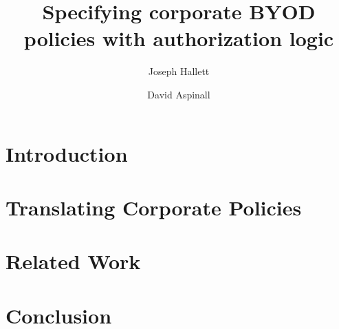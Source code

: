 \documentclass{easychair}
\title{Specifying corporate BYOD policies with authorization logic}
\author{
  Joseph Hallett\inst{1}
  \and
  David Aspinall\inst{1}
}
\institute{
  University of Edinburgh
}
\begin{document}
\maketitle

\begin{abstract}
\end{abstract}

\section{Introduction}


\section{Translating Corporate Policies}

\section{Related Work}

\section{Conclusion}



\end{document}
